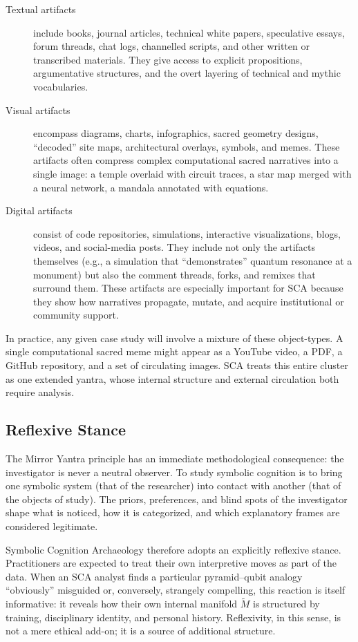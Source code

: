 \documentclass[12]{amsart}
\theoremstyle{plain}
\begin{document}
\begin{description}
  \item[Textual artifacts] include books, journal articles, technical white papers, speculative essays, forum threads, chat logs, channelled scripts, and other written or transcribed materials. They give access to explicit propositions, argumentative structures, and the overt layering of technical and mythic vocabularies.
  \item[Visual artifacts] encompass diagrams, charts, infographics, sacred geometry designs, ``decoded'' site maps, architectural overlays, symbols, and memes. These artifacts often compress complex computational sacred narratives into a single image: a temple overlaid with circuit traces, a star map merged with a neural network, a mandala annotated with equations.
  \item[Digital artifacts] consist of code repositories, simulations, interactive visualizations, blogs, videos, and social-media posts. They include not only the artifacts themselves (e.g., a simulation that ``demonstrates'' quantum resonance at a monument) but also the comment threads, forks, and remixes that surround them. These artifacts are especially important for SCA because they show how narratives propagate, mutate, and acquire institutional or community support.
\end{description}

In practice, any given case study will involve a mixture of these object-types. A single computational sacred meme might appear as a YouTube video, a PDF, a GitHub repository, and a set of circulating images. SCA treats this entire cluster as one extended yantra, whose internal structure and external circulation both require analysis.

\subsection{Reflexive Stance}

The Mirror Yantra principle has an immediate methodological consequence: the investigator is never a neutral observer. To study symbolic cognition is to bring one symbolic system (that of the researcher) into contact with another (that of the objects of study). The priors, preferences, and blind spots of the investigator shape what is noticed, how it is categorized, and which explanatory frames are considered legitimate.

Symbolic Cognition Archaeology therefore adopts an explicitly reflexive stance. Practitioners are expected to treat their own interpretive moves as part of the data. When an SCA analyst finds a particular pyramid–qubit analogy ``obviously'' misguided or, conversely, strangely compelling, this reaction is itself informative: it reveals how their own internal manifold $\tilde M$ is structured by training, disciplinary identity, and personal history. Reflexivity, in this sense, is not a mere ethical add-on; it is a source of additional structure.
\end{document}
